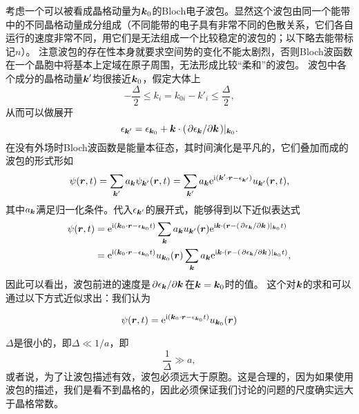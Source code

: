 考虑一个可以被看成晶格动量为$\vb*{k}_0$的Bloch电子波包。显然这个波包由同一个能带中的不同晶格动量成分组成（不同能带的电子具有非常不同的色散关系，它们各自运行的速度非常不同，用它们是无法组成一个比较稳定的波包的；以下略去能带标记$n$）。
注意波包的存在性本身就要求空间势的变化不能太剧烈，否则Bloch波函数在一个晶胞中将基本上定域在原子周围，无法形成比较“柔和”的波包。
波包中各个成分的晶格动量$\vb*{k}'$均很接近$\vb*{k}_0$，假定大体上
\begin{equation}
    - \frac{\Delta}{2} \leq k_i = k_{0i} - k'_i \leq \frac{\Delta}{2},
\end{equation}
从而可以做展开
\begin{equation}
    \epsilon_{\vb*{k}'} = \epsilon_{\vb*{k}_0} + \vb*{k} \cdot (\pdv*{\epsilon_{\vb*{k}}}{\vb*{k}})|_{\vb*{k}_0}.
\end{equation}
在没有外场时Bloch波函数是能量本征态，其时间演化是平凡的，它们叠加而成的波包的形式形如
\[
    \psi(\vb*{r}, t) = \sum_{\vb*{k}'} a_{\vb*{k}} \psi_{\vb*{k}'}(\vb*{r}, t) = \sum_{\vb*{k}'} a_{\vb*{k}} \mathrm{e}^{\mathrm{i} (\vb*{k}' \cdot \vb*{r} - \epsilon_{\vb*{k}'})} u_{\vb*{k}'}(\vb*{r}, t),
\]
其中$a_{\vb*{k}}$满足归一化条件。代入$\epsilon_{\vb*{k}'}$的展开式，能够得到以下近似表达式
\[
    \begin{aligned}
        \psi(\vb*{r}, t) &= \mathrm{e}^{\mathrm{i} (\vb*{k}_0 \cdot \vb*{r} - \epsilon_{\vb*{k}_0} t)} \sum_{\vb*{k}} a_{\vb*{k}} u_{\vb*{k}'}(\vb*{r}) \mathrm{e}^{\mathrm{i} \vb*{k} \cdot (\vb*{r} - (\pdv*{\epsilon_{\vb*{k}}}{\vb*{k}}) |_{\vb*{k}_0} t)} \\
        &= \mathrm{e}^{\mathrm{i} (\vb*{k}_0 \cdot \vb*{r} - \epsilon_{\vb*{k}_0} t)} u_{\vb*{k}_0}(\vb*{r}) \sum_{\vb*{k}} a_{\vb*{k}} \mathrm{e}^{\mathrm{i} \vb*{k} \cdot (\vb*{r} - (\pdv*{\epsilon_{\vb*{k}}}{\vb*{k}}) |_{\vb*{k}_0} t)}  ,
    \end{aligned}
\]
因此可以看出，波包前进的速度是$\pdv*{\epsilon_{\vb*{k}}}{\vb*{k}}$在$\vb*{k} = \vb*{k}_0$时的值。
这个对$\vb*{k}$的求和可以通过以下方式近似求出：我们认为%

\begin{equation}
    \psi(\vb*{r}, t) = \ee^{\ii (\vb*{k}_0 \cdot \vb*{r} - \epsilon_{\vb*{k}_0} t)} u_{\vb*{k}_0}(\vb*{r}) %
\end{equation}

$\Delta$是很小的，即$\Delta \ll 1 / a$，即
\begin{equation}
    \frac{1}{\Delta} \gg a,
\end{equation}
或者说，为了让波包描述有效，波包必须远大于原胞。这是合理的，因为如果使用波包的描述，我们是看不到晶格的，因此必须保证我们讨论的问题的尺度确实远大于晶格常数。

